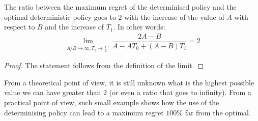 \begin{lemma}\label{lemma:gap2}
The ratio between the maximum regret of the determinised policy and the optimal deterministic policy goes to $2$ with the increase of the value of $A$ with respect to $B$ and the increase of $T_1$. In other words:  
\begin{align*}
\lim_{A/B \rightarrow \infty, T_1 \rightarrow {\frac{1}{2}}^+} \dfrac{2A-B}{A- A T_0 +(A-B) T_1} = 2
\end{align*}
\end{lemma}
\begin{proof}
The statement follows from the definition of the limit.
\end{proof}


From a theoretical point of view, it is still unknown what is the highest possible value we can have greater than $2$ (or even a ratio that goes to infinity). From a practical point of view, such small example shows how the use of the determinising policy can lead to a maximum regret  $100\%$ far from the optimal. 